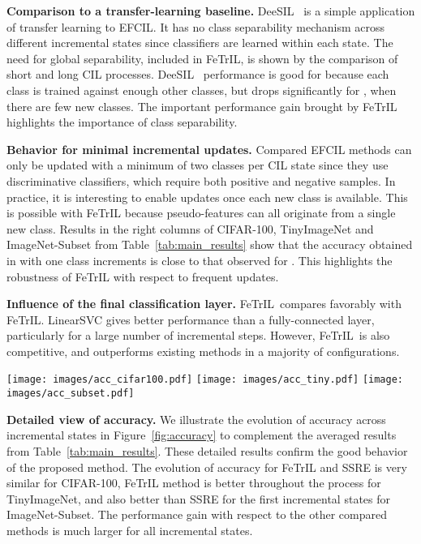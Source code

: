 \documentclass[10pt,twocolumn,letterpaper]{article}
\makeatletter
\newcommand{\ourmodel}{FeTrIL\@\xspace}
\newcommand{\ourmodelone}{FeTrIL~}
\newcommand{\ourmodeloneFcNospace}{FeTrIL}
\newcommand{\ourmodeloneFc}{FeTrIL~}
\makeatother
\begin{document}
\textbf{Comparison to a transfer-learning baseline.} DeeSIL~\cite{belouadah2018_deesil} is a simple application of transfer learning to EFCIL.
It has no class separability mechanism across different incremental states since classifiers are learned within each state. 
The need for global separability, included in \ourmodel, is shown by the comparison of short and long CIL processes.
DeeSIL~\cite{belouadah2018_deesil} performance is good for  because each class is trained against enough other classes, but drops significantly for , when there are few new classes.
The important performance gain brought by \ourmodel highlights the importance of class separability. 

\textbf{Behavior for minimal incremental updates.}
Compared EFCIL methods can only be updated with a minimum of two classes per CIL state since they use discriminative classifiers, which require both positive and negative samples.
In practice, it is interesting to enable updates once each new class is available.
This is possible with \ourmodel because pseudo-features can all originate from a single new class.
Results in the right columns of CIFAR-100, TinyImageNet and ImageNet-Subset from Table~\ref{tab:main_results} show that the accuracy obtained in with one class increments is close to that observed for . 
This highlights the robustness of \ourmodel with respect to frequent updates. 



\textbf{Influence of the final classification layer.} 
\ourmodelone compares favorably with \ourmodeloneFcNospace.
LinearSVC gives better performance than a fully-connected layer, particularly for a large number of incremental steps. 
However, \ourmodeloneFc is also competitive, and outperforms existing methods in a majority of configurations.

\begin{figure*}
\centering
    {{\texttt{[image: images/acc\_cifar100.pdf]} }}{{\texttt{[image: images/acc\_tiny.pdf]} }}{{\texttt{[image: images/acc\_subset.pdf]} }}\caption{Evolution of top-1 accuracy for an incremental process with  IL states. \textit{Best viewed in color.} }
\label{fig:accuracy}
\vspace{-2mm}
\end{figure*}

\textbf{Detailed view of accuracy.} We illustrate the evolution of accuracy across incremental states in Figure~\ref{fig:accuracy} to complement the averaged results from Table~\ref{tab:main_results}. 
These detailed results confirm the good behavior of the proposed method.
The evolution of accuracy for \ourmodel and SSRE is very similar for CIFAR-100, \ourmodel method is better throughout the process for TinyImageNet, and also better than SSRE for the first incremental states for ImageNet-Subset. 
The performance gain with respect to the other compared methods is much larger for all incremental states. 
\end{document}
